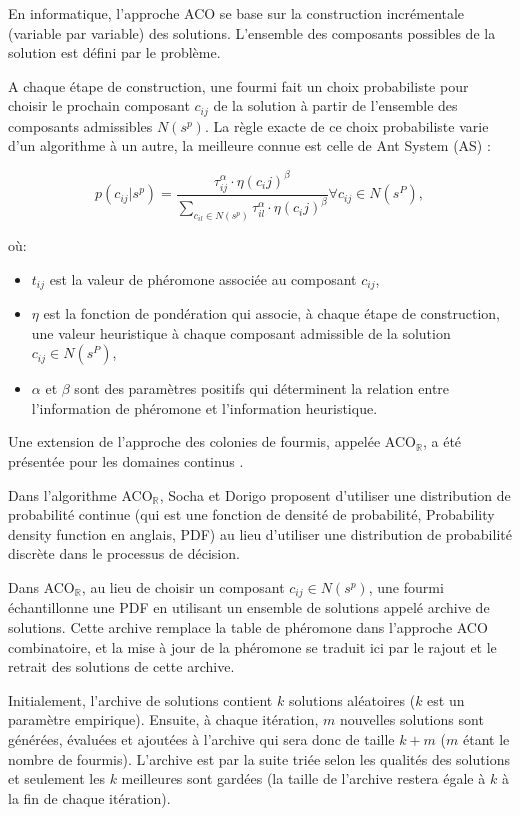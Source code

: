 En informatique, l'approche ACO se base sur la construction incrémentale (variable par variable) des solutions. L'ensemble des composants possibles de la solution est défini par le problème. 

A chaque étape de construction, une fourmi fait un
choix probabiliste pour choisir le prochain composant $c_{ij}$ de la solution à
partir de l'ensemble des composants admissibles $N(s^p)$. La règle exacte de ce choix probabiliste varie d'un algorithme à un autre, la meilleure connue est celle de Ant System (AS) \cite{dorigo1996ant}:

$$ p(c_{ij}|s^p) = \frac{\tau^\alpha_{ij}\cdot\eta(c_ij)^\beta}{\sum_{c_{il} \in N(s^p)} \tau^\alpha_{il}\cdot\eta(c_ij)^\beta} \forall c_{ij} \in N(s^P),
$$

où:
\begin{itemize}
	\item $t_{ij}$ est la valeur de phéromone associée au composant $c_{ij}$,
	\item $\eta$ est la fonction de pondération qui associe, à chaque étape de
	construction, une valeur heuristique à chaque composant admissible
	de la solution $c_{ij} \in N(s^P)$,
	\item $\alpha$ et $\beta$ sont des paramètres positifs qui déterminent la relation entre
	l'information de phéromone et l'information heuristique.
\end{itemize}
\bigskip\bigskip
Une extension de l'approche des colonies de fourmis, appelée ACO$_\mathbb{R}$,  a été présentée pour les domaines continus \cite{SOCHA_DORIGO_2006} . 

Dans l'algorithme ACO$_\mathbb{R}$, Socha et Dorigo proposent d'utiliser une distribution de
probabilité continue (qui est une fonction de densité de probabilité,
Probability density function en anglais, PDF) au lieu d'utiliser une distribution de
probabilité discrète dans le processus de décision.

Dans ACO$_\mathbb{R}$, au lieu de choisir un composant $c_{ij}\in N(s^p)$, une fourmi
échantillonne une PDF en utilisant un ensemble de solutions appelé
archive de solutions. Cette archive remplace la table de phéromone dans l'approche ACO combinatoire, et la mise à jour de la phéromone se traduit ici par le rajout et le retrait des solutions de cette archive. 

Initialement, l'archive de solutions contient $k$ solutions
aléatoires ($k$ est un paramètre empirique). Ensuite, à chaque itération, $m$ nouvelles solutions sont
générées, évaluées et ajoutées à l'archive qui sera donc de taille $k+m$ ($m$
étant le nombre de fourmis). L'archive est par la suite triée selon les
qualités des solutions et seulement les $k$ meilleures sont gardées (la taille
de l'archive restera égale à $k$ à la fin de chaque itération).\\

